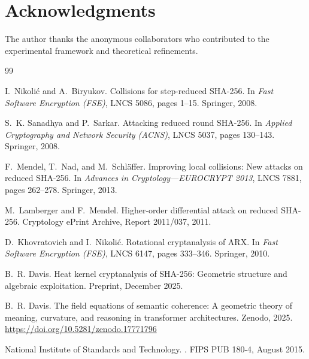 \documentclass[11pt,a4paper]{article}
\theoremstyle{plain}
\theoremstyle{definition}
\theoremstyle{remark}
\begin{document}
\section*{Acknowledgments}

The author thanks the anonymous collaborators who contributed to the experimental framework and theoretical refinements.

\begin{thebibliography}{99}

I.~Nikoli\'{c} and A.~Biryukov.
\newblock Collisions for step-reduced SHA-256.
\newblock In {\em Fast Software Encryption (FSE)}, LNCS 5086, pages 1--15. Springer, 2008.

S.~K. Sanadhya and P.~Sarkar.
\newblock Attacking reduced round SHA-256.
\newblock In {\em Applied Cryptography and Network Security (ACNS)}, LNCS 5037, pages 130--143. Springer, 2008.

F.~Mendel, T.~Nad, and M.~Schl\"{a}ffer.
\newblock Improving local collisions: New attacks on reduced SHA-256.
\newblock In {\em Advances in Cryptology---EUROCRYPT 2013}, LNCS 7881, pages 262--278. Springer, 2013.

M.~Lamberger and F.~Mendel.
\newblock Higher-order differential attack on reduced SHA-256.
\newblock Cryptology ePrint Archive, Report 2011/037, 2011.

D.~Khovratovich and I.~Nikoli\'{c}.
\newblock Rotational cryptanalysis of ARX.
\newblock In {\em Fast Software Encryption (FSE)}, LNCS 6147, pages 333--346. Springer, 2010.

B.~R. Davis.
\newblock Heat kernel cryptanalysis of SHA-256: Geometric structure and algebraic exploitation.
\newblock Preprint, December 2025.

B.~R. Davis.
\newblock The field equations of semantic coherence: A geometric theory of meaning, curvature, and reasoning in transformer architectures.
\newblock Zenodo, 2025. \url{https://doi.org/10.5281/zenodo.17771796}

National Institute of Standards and Technology.
.
\newblock FIPS PUB 180-4, August 2015.


\end{thebibliography}
\end{document}
